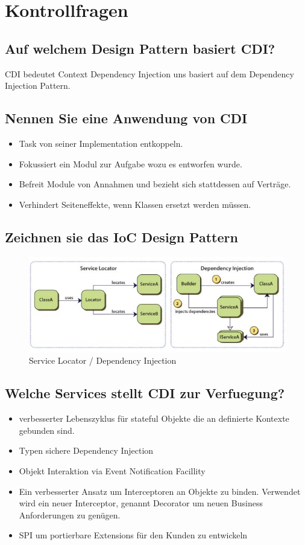 \section{Kontrollfragen}

\subsection{Auf welchem Design Pattern basiert CDI?}
CDI bedeutet Context Dependency Injection uns basiert auf dem Dependency Injection Pattern.

\subsection{Nennen Sie eine Anwendung von CDI}
\begin{itemize}
	\item Task von seiner Implementation entkoppeln.
	\item Fokussiert ein Modul zur Aufgabe wozu es entworfen wurde.
	\item Befreit Module von Annahmen und bezieht sich stattdessen auf Verträge.
	\item Verhindert Seiteneffekte, wenn Klassen ersetzt werden müssen.
\end{itemize}

\subsection{Zeichnen sie das IoC Design Pattern}
\begin{figure}
	\centering
	\includegraphics[width=0.7\linewidth]{fig/service-locator-di}
	\caption{Service Locator / Dependency Injection}
	\label{fig:service-locator-di}
\end{figure}

\subsection{Welche Services stellt CDI zur Verfuegung?}
\begin{itemize}
	\item verbesserter Lebenszyklus für stateful Objekte die an definierte Kontexte gebunden sind.
	\item Typen sichere Dependency Injection
	\item Objekt Interaktion via Event Notification Facillity
	\item Ein verbesserter Ansatz um Interceptoren an Objekte zu binden. Verwendet wird ein neuer Interceptor, genannt Decorator um neuen Business Anforderungen zu genügen.
	\item SPI um portierbare Extensions für den Kunden zu entwickeln
\end{itemize}

